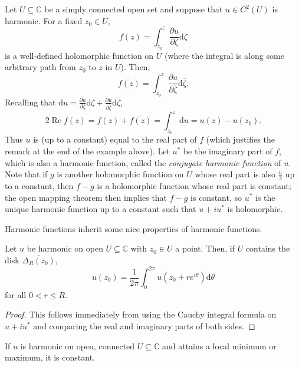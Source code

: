 \documentclass[10pt]{article}
\providecommand{\ol}{\overline}
\providecommand{\dd}{\mathrm d}
\providecommand{\CC}{\mathbb C}
\providecommand{\opname}{\operatorname}
\providecommand{\vocab}[1]{{{\sffamily\textit{#1}}}}
\begin{document}
Let $U\subseteq\CC$ be a simply connected open set
and suppose that $u\in C^2(U)$ is harmonic. For a fixed $z_0\in U$,
\begin{equation*}
    f(z) = \int_{z_0}^z\frac{\partial u}{\partial \zeta}\dd\zeta
\end{equation*}
is a well-defined holomorphic function on $U$
(where the integral is along some arbitrary path from $z_0$ to $z$ in $U$).
Then,
\begin{equation*}
    \ol{f(z)} = \int_{z_0}^z \frac{\partial u}{\partial\ol\zeta}\dd\ol\zeta.
\end{equation*}
Recalling that $\dd u = \frac{\partial u}{\partial\zeta}\dd\zeta +
\frac{\partial u}{\partial\ol\zeta}\dd\ol\zeta$,
\begin{equation*}
    2\opname{Re}f(z) = f(z) + \ol{f(z)}
    = \int_{z_0}^z \dd u = u(z) - u(z_0).
\end{equation*}
Thus $u$ is (up to a constant) equal to the real part of $f$
(which justifies the remark at the end of the example above).
Let $u^*$ be the imaginary part of $f$, which is also a harmonic function,
called the \vocab{conjugate harmonic function} of $u$.
Note that if $g$ is another holomorphic function on $U$
whose real part is also $\frac u2$ up to a constant, then
$f-g$ is a holomorphic function whose real part is constant;
the open mapping theorem then implies that $f-g$ is constant,
so $u^*$ is the unique harmonic function up to a constant
such that $u + iu^*$ is holomorphic.

Harmonic functions inherit some nice properties of harmonic functions.
\begin{prop}
    \label{prop:mean-value-thm}
    Let $u$ be harmonic on open $U\subseteq\CC$ with $z_0\in U$ a point.
    Then, if $U$ contains the disk $\ol{\Delta_R(z_0)}$,
    \begin{equation*}
	u(z_0) = \frac 1{2\pi}\int_0^{2\pi} u(z_0 + re^{i\theta})\dd\theta
    \end{equation*}
    for all $0 < r \le R$.
\end{prop}

\begin{proof}
    This follows immediately from using the Cauchy integral formula
    on $u + iu^*$ and comparing the real and imaginary parts of both sides.
\end{proof}

\pagebreak
\begin{prop}
    \label{prop:max-min}
    If $u$ is harmonic on open, connected $U\subseteq\CC$ and attains
    a local minimum or maximum, it is constant.
\end{prop}
\end{document}
